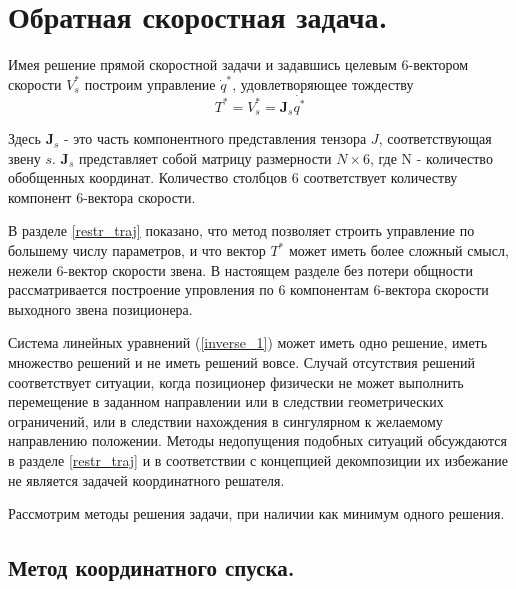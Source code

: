 \section{Обратная скоростная задача.}\label{invspd_sect}

Имея решение прямой скоростной задачи и задавшись целевым 6-вектором скорости $V_s^*$ построим управление $\dot{q}^{*}$, удовлетворяющее тождеству
\begin{equation}\label{inverse_1}
T^* = V_s^* = \textbf{J}_s\dot{q^*}  
\end{equation}

Здесь $\textbf{J}_s$ - это часть компонентного представления тензора $J$, соответствующая звену $s$. $\textbf{J}_s$ представляет собой матрицу размерности $N\times6$, где N - количество обобщенных координат. Количество столбцов $6$ соответствует количеству компонент 6-вектора скорости. 

\colorbox{shadecolor}
{\parbox{0.9\textwidth}{В разделе \ref{restr_traj} показано, что метод позволяет строить управление по большему числу параметров, и что вектор $T^*$ может иметь более сложный смысл, нежели 6-вектор скорости звена. В настоящем разделе без потери общности рассматривается построение упровления по 6 компонентам 6-вектора скорости выходного звена позиционера.}}

Система линейных уравнений (\ref{inverse_1}) может иметь одно решение, иметь множество решений и не иметь решений вовсе. Случай отсутствия решений соответствует ситуации, когда позиционер физически не может выполнить перемещение в заданном направлении или в следствии геометрических ограничений, или в следствии нахождения в сингулярном к желаемому направлению положении. Методы недопущения подобных ситуаций обсуждаются в разделе \ref{restr_traj} и в соответствии с концепцией декомпозиции их избежание не является задачей координатного решателя. 

Рассмотрим методы решения задачи, при наличии как минимум одного решения.

\subsection{Метод координатного спуска.}